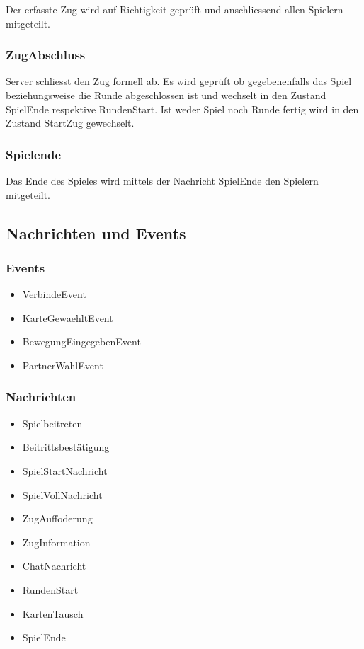 \documentclass[12pt,halfparskip]{scrartcl}
\begin{document}
Der erfasste Zug wird auf Richtigkeit geprüft und anschliessend allen Spielern mitgeteilt.


\subsubsection{ZugAbschluss} %
\label{ssub:zugabschluss}
Server schliesst den Zug formell ab. Es wird geprüft ob gegebenenfalls das Spiel beziehungsweise die Runde abgeschlossen ist und wechselt in den Zustand SpielEnde respektive RundenStart. Ist weder Spiel noch Runde fertig wird in den Zustand StartZug gewechselt.

\subsubsection{Spielende} %
\label{ssub:spielende}

Das Ende des Spieles wird mittels der Nachricht SpielEnde den Spielern mitgeteilt. 

\subsection{Nachrichten und Events} %
\label{sub:nachrichten_und_events}


\subsubsection{Events} %
\label{ssub:events}

\begin{itemize}
	\item VerbindeEvent
	\item KarteGewaehltEvent
	\item BewegungEingegebenEvent
	\item PartnerWahlEvent
\end{itemize}


\subsubsection{Nachrichten} %
\label{ssub:nachrichten}

\begin{itemize}
	\item Spielbeitreten
	\item Beitrittsbestätigung
	\item SpielStartNachricht
	\item SpielVollNachricht
	\item ZugAuffoderung
	\item ZugInformation
	\item ChatNachricht
	\item RundenStart
	\item KartenTausch
	\item SpielEnde
\end{itemize}
\end{document}

